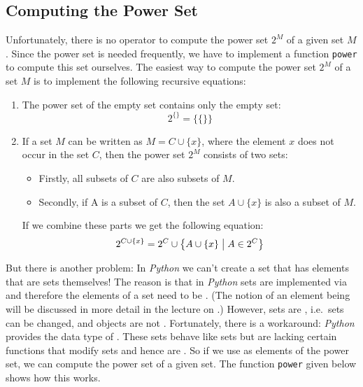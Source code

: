 \subsection{Computing the Power Set}\label{computing-the-power-set}
Unfortunately, there is no operator to compute the power set \(2^M\) of
a given set \(M\). Since the power set is needed frequently, we have to
implement a function \texttt{power} to compute this set ourselves. The easiest
way to compute the power set \(2^M\) of a set \(M\) is to implement the
following recursive equations:
\begin{enumerate}
\item The power set of the empty set contains only the empty set:
    $$2^{\{\}} = \bigl\{\{\}\bigr\}$$
\item If a set $M$ can be written as $M = C \cup \{x\}$, where the element $x$ does not occur in the set $C$, then the power set $2^M$ consists of two sets:
      \begin{itemize}
        \item Firstly, all subsets of $C$ are also subsets of $M$.
        \item Secondly, if A is a subset of $C$, then the set $A \cup\{x\}$ is also a subset of $M$.
      \end{itemize}
    If we combine these parts we get the following equation:
    $$2^{C \cup \{x\}} = 2^C \cup \bigl\{ A \cup \{x\} \bigm| A \in 2^C \bigr\}$$
\end{enumerate}
But there is another problem: In \textsl{Python} we can't create a set
that has elements that are sets themselves! The reason is that in
\textsl{Python} sets are implemented via  and therefore
the elements of a set need to be .  
(The notion of an
element being  will be discussed in more detail in the
lecture on .) However, sets are  , i.e.~sets can be changed,
and  objects are not . Fortunately, there is a
workaround: \textsl{Python} provides the data type of .
These sets behave like sets but are lacking certain functions that modify sets and
hence are . So if we use  as elements of the
power set, we can compute the power set of a given set. The function
\texttt{power} given below shows how this works.

